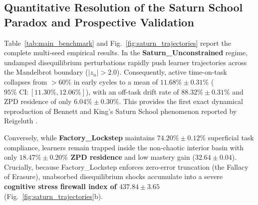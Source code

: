 \documentclass[10pt,twocolumn,a4paper]{article}
\begin{document}
\subsection{Quantitative Resolution of the Saturn School Paradox and Prospective Validation}
Table~\ref{tab:main_benchmark} and Fig.~\ref{fig:saturn_trajectories} report the complete multi-seed empirical results. In the \textbf{Saturn\_Unconstrained} regime, undamped disequilibrium perturbations rapidly push learner trajectories across the Mandelbrot boundary ($|z_n| > 2.0$). Consequently, active time-on-task collapses from $>60\%$ in early cycles to a mean of \textbf{$11.68\% \pm 0.31\%$} ($95\%\text{ CI}: [11.30\%, 12.06\%]$), with an off-task drift rate of \textbf{$88.32\% \pm 0.31\%$} and ZPD residence of only \textbf{$6.04\% \pm 0.30\%$}. This provides the first exact dynamical reproduction of Bennett and King's \cite{bennett1991saturn} Saturn School phenomenon reported by Reigeluth \cite{reigeluth2008chaos}.

Conversely, while \textbf{Factory\_Lockstep} maintains $74.20\% \pm 0.12\%$ superficial task compliance, learners remain trapped inside the non-chaotic interior basin with only \textbf{$18.47\% \pm 0.20\%$ ZPD residence} and low mastery gain ($32.64 \pm 0.04$). Crucially, because Factory\_Lockstep enforces zero-error truncation (the Fallacy of Erasure), unabsorbed disequilibrium shocks accumulate into a severe \textbf{cognitive stress firewall index of $437.84 \pm 3.65$} (Fig.~\ref{fig:saturn_trajectories}b).
\end{document}
